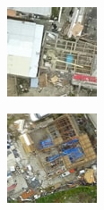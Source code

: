 \begin{figure} [H]
	\centering
	\captionsetup{justification=raggedright,singlelinecheck=false}
	\begin{subfigure}{.275\textwidth}
		\centering
		\includegraphics[width=.95\linewidth]{figs/1.jpg}
	\end{subfigure}
	\begin{subfigure}{.275\textwidth}
		\centering
		\includegraphics[width=.95\linewidth]{figs/2.jpg}

\end{subfigure}
\end{figure}
